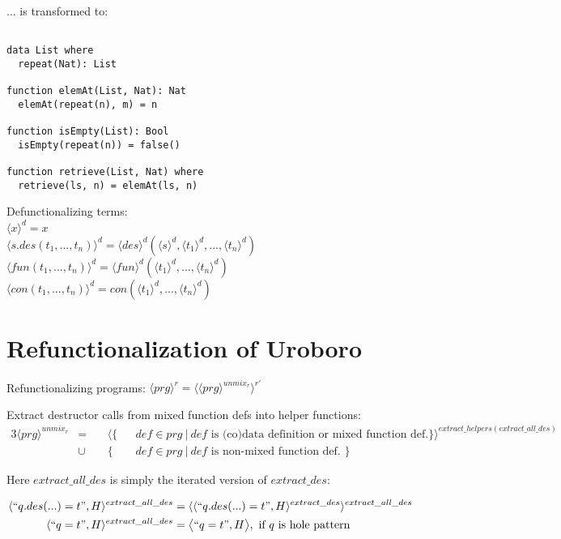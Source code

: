 \documentclass[11pt]{article} %
\begin{document}
... is transformed to:

\begin{lstlisting}

data List where
  repeat(Nat): List

function elemAt(List, Nat): Nat
  elemAt(repeat(n), m) = n

function isEmpty(List): Bool
  isEmpty(repeat(n)) = false()

function retrieve(List, Nat) where
  retrieve(ls, n) = elemAt(ls, n)

\end{lstlisting}

Defunctionalizing terms: \\
$\langle x \rangle^d = x$ \\
$\langle s.des(t_1, ..., t_n) \rangle^d = \langle des \rangle^d (\langle s \rangle^d, \langle t_1 \rangle^d, ..., \langle t_n \rangle^d)$ \\
$\langle fun(t_1, ..., t_n) \rangle^d = \langle fun \rangle^d (\langle t_1 \rangle^d, ..., \langle t_n \rangle^d)$ \\
$\langle con(t_1, ..., t_n) \rangle^d = con(\langle t_1 \rangle^d, ..., \langle t_n \rangle^d)$ \\

\section{Refunctionalization of Uroboro}

Refunctionalizing programs: $\langle prg \rangle^r = \langle \langle prg \rangle^{unmix_r} \rangle^{r'}$

Extract destructor calls from mixed function defs into helper functions:
\begin{alignat*}{3}
\langle prg \rangle^{unmix_r} & = ~&& \langle \{ && def \in prg ~ | ~ def \textrm{ is (co)data definition or mixed function def.} \} \rangle^{extract\_helpers(extract\_all\_des)} \\
&\cup && \{ && def \in prg ~ | ~ def \textrm{ is non-mixed function def. } \}
\end{alignat*}

Here $extract\_all\_des$ is simply the iterated version of $extract\_des$:

\begin{alignat*}{2}
\langle `` q.des(...) = t ", H \rangle^{extract\_all\_des} & = \langle \langle `` q.des(...) = t ", H \rangle^{extract\_des} \rangle^{extract\_all\_des} \\
\langle `` q = t ", H \rangle^{extract\_all\_des} & = \big\langle `` q = t ", H \big\rangle, \textrm{ if $q$ is hole pattern}
\end{alignat*}
\end{document}
